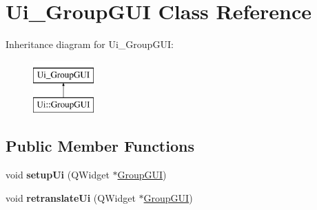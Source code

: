 \hypertarget{classUi__GroupGUI}{}\section{Ui\+\_\+\+Group\+G\+UI Class Reference}
\label{classUi__GroupGUI}
Inheritance diagram for Ui\+\_\+\+Group\+G\+UI\+:\begin{figure}[H]
\begin{center}
\leavevmode
\includegraphics[height=2.000000cm]{classUi__GroupGUI}
\end{center}
\end{figure}
\subsection*{Public Member Functions}
\begin{DoxyCompactItemize}
\item 
void {\bfseries setup\+Ui} (Q\+Widget $\ast$\hyperlink{classGroupGUI}{Group\+G\+UI})\hypertarget{classUi__GroupGUI_a38d3d32c450130f3ec3a059473175dd8}{}\label{classUi__GroupGUI_a38d3d32c450130f3ec3a059473175dd8}

\item 
void {\bfseries retranslate\+Ui} (Q\+Widget $\ast$\hyperlink{classGroupGUI}{Group\+G\+UI})\hypertarget{classUi__GroupGUI_a896393369cb1ec8fb28afe928fcf153d}{}\label{classUi__GroupGUI_a896393369cb1ec8fb28afe928fcf153d}

\end{DoxyCompactItemize}
